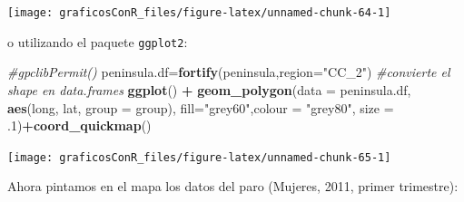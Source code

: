\documentclass[]{article}
\newenvironment{Shaded}{\begin{snugshade}}{\end{snugshade}}
\newcommand{\CommentTok}[1]{\textcolor[rgb]{0.56,0.35,0.01}{\textit{#1}}}
\newcommand{\DataTypeTok}[1]{\textcolor[rgb]{0.13,0.29,0.53}{#1}}
\newcommand{\FloatTok}[1]{\textcolor[rgb]{0.00,0.00,0.81}{#1}}
\newcommand{\KeywordTok}[1]{\textcolor[rgb]{0.13,0.29,0.53}{\textbf{#1}}}
\newcommand{\NormalTok}[1]{#1}
\newcommand{\OperatorTok}[1]{\textcolor[rgb]{0.81,0.36,0.00}{\textbf{#1}}}
\newcommand{\StringTok}[1]{\textcolor[rgb]{0.31,0.60,0.02}{#1}}
\numberwithin{ejcnt}{section}
\begin{document}
\begin{center}\texttt{[image: graficosConR\_files/figure-latex/unnamed-chunk-64-1]} \end{center}

o utilizando el paquete \texttt{ggplot2}:

\begin{Shaded}
\begin{Highlighting}[]
\CommentTok{#gpclibPermit()}
\NormalTok{peninsula.df=}\KeywordTok{fortify}\NormalTok{(peninsula,}\DataTypeTok{region=}\StringTok{"CC_2"}\NormalTok{) }\CommentTok{#convierte el shape en data.frames}
\KeywordTok{ggplot}\NormalTok{() }\OperatorTok{+}\StringTok{ }\KeywordTok{geom_polygon}\NormalTok{(}\DataTypeTok{data =}\NormalTok{ peninsula.df, }\KeywordTok{aes}\NormalTok{(long, lat, }\DataTypeTok{group =}\NormalTok{ group), }
                        \DataTypeTok{fill=}\StringTok{"grey60"}\NormalTok{,}\DataTypeTok{colour =} \StringTok{"grey80"}\NormalTok{, }\DataTypeTok{size =} \FloatTok{.1}\NormalTok{)}\OperatorTok{+}\KeywordTok{coord_quickmap}\NormalTok{()}
\end{Highlighting}
\end{Shaded}

\begin{center}\texttt{[image: graficosConR\_files/figure-latex/unnamed-chunk-65-1]} \end{center}

Ahora pintamos en el mapa los datos del paro (Mujeres, 2011, primer trimestre):
\end{document}
